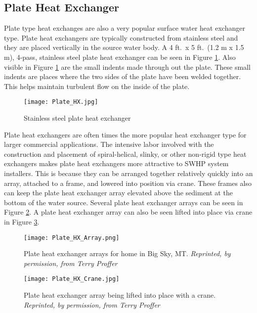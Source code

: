 	
	\subsection{Plate Heat Exchanger}
	\label{subsec:Intro:HXOverview:PHX}
	
Plate type heat exchanges are also a very popular surface water heat exchanger type. Plate heat exchangers are typically constructed from stainless steel and they are placed vertically in the source water body. A 4 ft.\ x 5 ft.\ (1.2 m x 1.5 m), 4-pass, stainless steel plate heat exchanger can be seen in Figure \ref{fig:Intro:HXOverview:PHX:PHXpicture}. Also visible in Figure \ref{fig:Intro:HXOverview:PHX:PHXpicture} are the small indents made through out the plate. These small indents are places where the two sides of the plate have been welded together. This helps maintain turbulent flow on the inside of the plate.

	\begin{figure}
		\centering
		\texttt{[image: Plate\_HX.jpg]}
		\caption[Stainless steel plate heat exchanger]{Stainless steel plate heat exchanger}
		\label{fig:Intro:HXOverview:PHX:PHXpicture}
	\end{figure}

Plate heat exchangers are often times the more popular heat exchanger type for larger commercial applications. The intensive labor involved with the construction and placement of spiral-helical, slinky, or other non-rigid type heat exchangers makes plate heat exchangers more attractive to SWHP system installers. This is because they can be arranged together relatively quickly into an array, attached to a frame, and lowered into position via crane. These frames also can keep the plate heat exchanger array elevated above the sediment at the bottom of the water source. Several plate heat exchanger arrays can be seen in Figure \ref{fig:Intro:HXOverview:PHX:PHXarray}. A plate heat exchanger array can also be seen lifted into place via crane in Figure \ref{fig:Intro:HXOverview:PHX:PHXcrane}.

	\begin{figure}
		\centering
		\texttt{[image: Plate\_HX\_Array.png]}
		\caption[Installed plate heat exchanger arrays]{Plate heat exchanger arrays for home  in Big Sky, MT. \textit{Reprinted, by permission, from Terry Proffer}}
		\label{fig:Intro:HXOverview:PHX:PHXarray}
	\end{figure}
	
	\begin{figure}
		\centering
		\texttt{[image: Plate\_HX\_Crane.jpg]}
		\caption[Plate heat exchanger array installation]{Plate heat exchanger array being lifted into place with a crane. \textit{Reprinted, by permission, from Terry Proffer}}
		\label{fig:Intro:HXOverview:PHX:PHXcrane}
	\end{figure}

